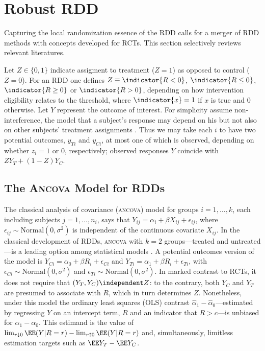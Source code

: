 \section{Robust RDD}
Capturing the local randomization essence of the RDD calls for
a merger of RDD methods with concepts developed for RCTs. This
section selectively reviews relevant literatures.

Let $Z \in \{0,1\}$ indicate assigment to treatment ($Z=1$) as opposed to control
($Z=0$).  For an RDD one defines $Z \equiv \indicator{R< 0}$,
$\indicator{R \leq 0}$, $\indicator{R\geq 0}$ or $\indicator{R > 0}$,
depending on how intervention eligibility relates to the threshold,
where $\indicator{x}=1$ if $x$ is true and $0$ otherwise.
Let $Y$ represent the outcome of interest.
For simplicity assume non-interference, the model that
a subject's response may depend on his but not also on other subjects'
treatment assignments \citep{cox:1958,rubin:1978}.  Thus we may take each $i$
to have two potential outcomes, $y_{Ti}$ and $y_{Ci}$, at most one of which is observed, depending on whether $z_i=1$ or $0$, respectively;
 observed
responses $Y$ coincide with $ZY_{T}+(1-Z)Y_{C}$.

\subsection{The \textsc{Ancova} Model for RDDs}\label{sec:robust-analys-covar}

The classical analysis of covariance (\textsc{ancova}) model for
groups $i=1,\ldots, k$, each including subjects $j=1, \ldots, n_{i}$,
says that
$Y_{ij} = \alpha_{i} + \beta X_{ij} + \epsilon_{ij}$, where $\epsilon_{ij}
\sim \mathrm{Normal}(0, \sigma^{2})$ is independent of the continuous
covariate $X_{ij}$.
In the classical development of RDDs, \textsc{ancova} with $k=2$
groups---treated and untreated---is a leading option among statistical
models
\citep{thistlethwaite1960regression}.
A potential outcomes version of the model is
 $Y_{Ci} = \alpha_{0} + \beta R_{i} + \epsilon_{Ci}$ and
$Y_{Ti} = \alpha_{1}  + \beta R_{i} + \epsilon_{Ti}$, with
 $\epsilon_{Ci} \sim \mathrm{Normal}(0, \sigma^{2})$ and
 $\epsilon_{Ti} \sim \mathrm{Normal}(0, \sigma^{2})$.
In marked contrast to RCTs, it does
not require that $(Y_{T}, Y_{C}) \independent Z$: to the contrary, both
$Y_{C}$ and $Y_{T}$ are presumed to associate with $R$, which in turn
determines $Z$.
Nonetheless, under this model the ordinary least squares
(OLS) contrast $\hat{\alpha}_{1} - \hat{\alpha}_{0}$---estimated by
regressing $Y$ on an intercept term, $R$ and an indicator that $R>c$---is unbiased for
$\alpha_{1} - \alpha_{0}$.
This estimand is the value of  $\lim_{r\downarrow 0} \EE(Y | R=r) -
\lim_{r\uparrow 0} \EE(Y | R=r)$ and, simultaneously,
limitless estimation targets such as $\EE Y_{T}  - \EE Y_{C}$.

